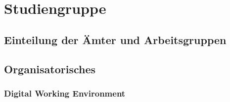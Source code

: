 \chapter{Studiengruppe}
\blindtext

\section{Einteilung der Ämter und Arbeitsgruppen}

\section{Organisatorisches}

\subsection{Digital Working Environment}